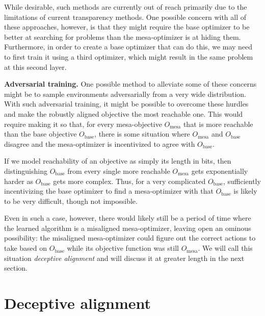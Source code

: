 \documentclass[
  onecolumn,
  natbib,
]{miri-tech-article}
\begin{document}
While desirable, such methods are currently out of reach primarily due to the limitations of current transparency methods. One possible concern with all of these approaches, however, is that they might require the base optimizer to be better at searching for problems than the mesa-optimizer is at hiding them. Furthermore, in order to create a base optimizer that can do this, we may need to first train it using a third optimizer, which might result in the same problem at this second layer.

\textbf{Adversarial training.} One possible method to alleviate some of these concerns might be to sample environments adversarially from a very wide distribution. With such adversarial training, it might be possible to overcome these hurdles and make the robustly aligned objective the most reachable one. This would require making it so that, for every mesa-objective $O_\text{mesa}$ that is more reachable than the base objective $O_\text{base}$, there is some situation where $O_\text{mesa}$ and $O_\text{base}$ disagree and the mesa-optimizer is incentivized to agree with $O_\text{base}$.

If we model reachability of an objective as simply its length in bits, then distinguishing $O_\text{base}$ from every single more reachable $O_\text{mesa}$ gets exponentially harder as $O_\text{base}$ gets more complex. Thus, for a very complicated $O_\text{base}$, sufficiently incentivizing the base optimizer to find a mesa-optimizer with that $O_\text{base}$ is likely to be very difficult, though not impossible.

Even in such a case, however, there would likely still be a period of time where the learned algorithm is a misaligned mesa-optimizer, leaving open an ominous possibility: the misaligned mesa-optimizer could figure out the correct actions to take based on $O_\text{base}$ while its objective function was still $O_\text{mesa}$. We will call this situation \textit{deceptive alignment} and will discuss it at greater length in the next section.

\section{Deceptive alignment}
\label{sec:4}
\end{document}
